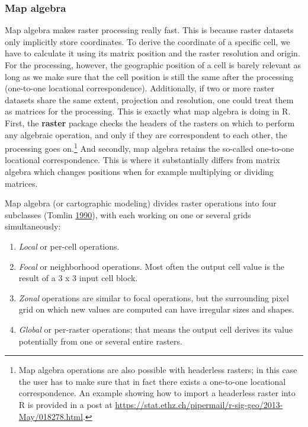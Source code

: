\documentclass[]{krantz}
\providecommand{\tightlist}{%
  \setlength{\itemsep}{0pt}\setlength{\parskip}{0pt}}
\let\rmarkdownfootnote\footnote%
\def\footnote{\protect\rmarkdownfootnote}
\begin{document}
\hypertarget{map-algebra}{%
\subsubsection{Map algebra}\label{map-algebra}}

Map algebra makes raster processing really fast.
This is because raster datasets only implicitly store coordinates.
To derive the coordinate of a specific cell, we have to calculate it using its matrix position and the raster resolution and origin.
For the processing, however, the geographic position of a cell is barely relevant as long as we make sure that the cell position is still the same after the processing (one-to-one locational correspondence).
Additionally, if two or more raster datasets share the same extent, projection and resolution, one could treat them as matrices for the processing.
This is exactly what map algebra is doing in R.
First, the \textbf{raster} package checks the headers of the rasters on which to perform any algebraic operation, and only if they are correspondent to each other, the processing goes on.\footnote{Map algebra operations are also possible with headerless rasters; in this case the user has to make sure that in fact there exists a one-to-one locational correspondence.
  An example showing how to import a headerless raster into R is provided in a post at \url{https://stat.ethz.ch/pipermail/r-sig-geo/2013-May/018278.html}.}
And secondly, map algebra retains the so-called one-to-one locational correspondence.
This is where it substantially differs from matrix algebra which changes positions when for example multiplying or dividing matrices.

Map algebra (or cartographic modeling) divides raster operations into four subclasses (Tomlin \protect\hyperlink{ref-tomlin_geographic_1990}{1990}), with each working on one or several grids simultaneously:

\begin{enumerate}
\def\labelenumi{\arabic{enumi}.}
\tightlist
\item
  \emph{Local} or per-cell operations.
\item
  \emph{Focal} or neighborhood operations.
  Most often the output cell value is the result of a 3 x 3 input cell block.
\item
  \emph{Zonal} operations are similar to focal operations, but the surrounding pixel grid on which new values are computed can have irregular sizes and shapes.
\item
  \emph{Global} or per-raster operations; that means the output cell derives its value potentially from one or several entire rasters.
\end{enumerate}
\end{document}

